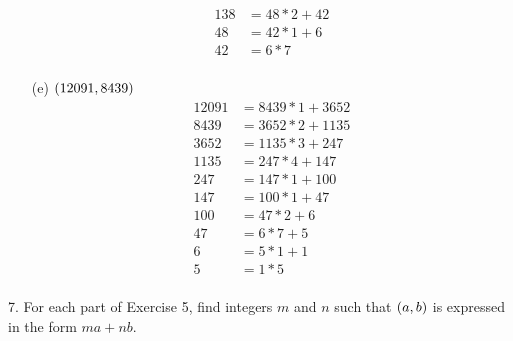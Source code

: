 \begin{mdframed}[style=darkAnswer,frametitle={Joe Starr}]
\begin{multicols}{2}
\begin{itemize}
{\begin{align*}
              138  & =48*2+42    \\
              48   & =42*1+6     \\
              42   & =6*7        \\
            \end{align*}
            }
      \item [(e)] {$\left(12091,8439\right)$
            \begin{align*}
              12091 & =8439*1+3652 \\
              8439  & =3652*2+1135 \\
              3652  & =1135*3+247  \\
              1135  & =247*4+147   \\
              247   & =147*1+100   \\
              147   & =100*1+47    \\
              100   & =47*2+6      \\
              47    & =6*7+5       \\
              6     & =5*1+1       \\
              5     & =1*5         \\
            \end{align*}
            }
    \end{itemize}
  \end{multicols}
\end{mdframed}
\newpage
\begin{mdframed}[style=darkQuesion]
  7.    For each part of Exercise 5, find integers $m$ and $n$ such that
  $\left(a,b\right)$ is expressed in the form $ma+nb$.

\end{mdframed}

